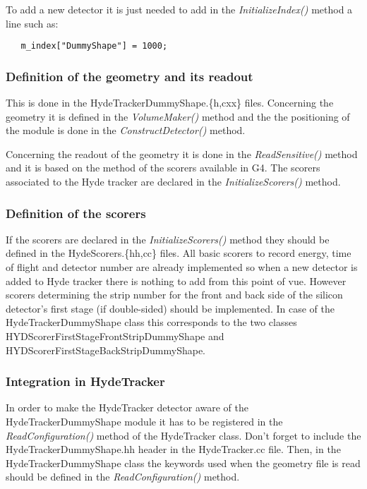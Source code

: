 \documentclass[a4paper,12pt]{article}
\begin{document}
To add a new detector it is just needed to add in the {\it InitializeIndex()}
method a line such as:

\begin{verbatim}
   m_index["DummyShape"] = 1000;
\end{verbatim}

\subsubsection{Definition of the geometry and its readout}
This is done in the HydeTrackerDummyShape.\{h,cxx\} files. Concerning
the geometry it is defined in the {\it VolumeMaker()} method and the 
the positioning of the module is done in the {\it ConstructDetector()} 
method. 

Concerning the readout of the geometry it is done in the {\it ReadSensitive()} 
method and it is based on the method of the scorers available in G4. The 
scorers associated to the Hyde tracker are declared in the {\it 
InitializeScorers()} method.

\subsubsection{Definition of the scorers}
If the scorers are declared in the {\it InitializeScorers()} method they should
be defined in the HydeScorers.\{hh,cc\} files. All basic scorers to record
energy, time of flight and detector number are already implemented so when a new
detector is added to Hyde tracker there is nothing to add from this point
of vue. However scorers determining the strip number for the front and back
side of the silicon detector's first stage (if double-sided) should be implemented.
In case of the HydeTrackerDummyShape class this corresponds to the two classes
HYDScorerFirstStageFrontStripDummyShape and HYDScorerFirstStageBackStripDummyShape.

\subsubsection{Integration in HydeTracker}
In order to make the HydeTracker detector aware of the HydeTrackerDummyShape
module it has to be registered in the {\it ReadConfiguration()} method of the 
HydeTracker class. Don't forget to include the HydeTrackerDummyShape.hh 
header in the HydeTracker.cc file. Then, in the HydeTrackerDummyShape class 
the keywords used when the geometry file is read should be defined in the {\it 
ReadConfiguration()} method.
\end{document}
